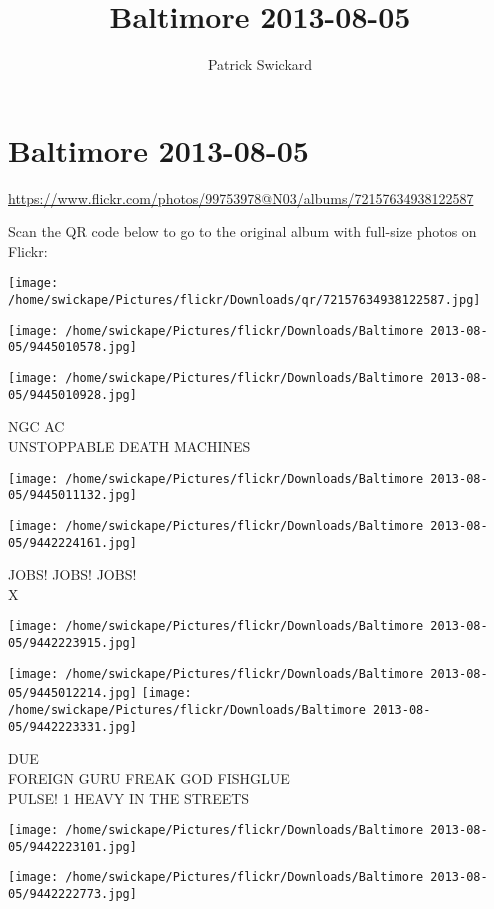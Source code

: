 \documentclass[10pt,letterpaper]{article}
\title{Baltimore 2013-08-05}
\author{Patrick Swickard}
\date{}
\begin{document}
\section*{Baltimore 2013-08-05}

\url{https://www.flickr.com/photos/99753978@N03/albums/72157634938122587}

Scan the QR code below to go to the original album with full-size photos on Flickr:

\texttt{[image: /home/swickape/Pictures/flickr/Downloads/qr/72157634938122587.jpg]}
\pagebreak

\texttt{[image: /home/swickape/Pictures/flickr/Downloads/Baltimore 2013-08-05/9445010578.jpg]}

\vspace{0.25in}
\texttt{[image: /home/swickape/Pictures/flickr/Downloads/Baltimore 2013-08-05/9445010928.jpg]}

NGC AC\\
UNSTOPPABLE DEATH MACHINES
\pagebreak

\texttt{[image: /home/swickape/Pictures/flickr/Downloads/Baltimore 2013-08-05/9445011132.jpg]}

\vspace{0.25in}
\texttt{[image: /home/swickape/Pictures/flickr/Downloads/Baltimore 2013-08-05/9442224161.jpg]}

JOBS! JOBS! JOBS!\\
X
\pagebreak

\texttt{[image: /home/swickape/Pictures/flickr/Downloads/Baltimore 2013-08-05/9442223915.jpg]}

\vspace{0.25in}
\texttt{[image: /home/swickape/Pictures/flickr/Downloads/Baltimore 2013-08-05/9445012214.jpg]}
\texttt{[image: /home/swickape/Pictures/flickr/Downloads/Baltimore 2013-08-05/9442223331.jpg]}

DUE\\
FOREIGN GURU FREAK GOD FISHGLUE\\
PULSE! 1 HEAVY IN THE STREETS
\pagebreak

\texttt{[image: /home/swickape/Pictures/flickr/Downloads/Baltimore 2013-08-05/9442223101.jpg]}

\vspace{0.25in}
\texttt{[image: /home/swickape/Pictures/flickr/Downloads/Baltimore 2013-08-05/9442222773.jpg]}
\end{document}

